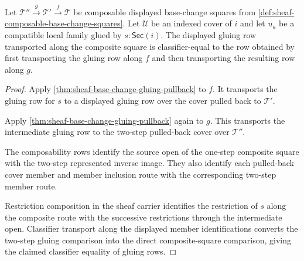 \begin{theorem}
\label{thm:sheaf-base-change-gluing-pullback-composition}
Let $\mathcal{T}''\xrightarrow{g}\mathcal{T}'\xrightarrow{f}\mathcal{T}$ be composable displayed base-change squares from \autoref{def:sheaf-composable-base-change-squares}. Let $\mathcal{U}$ be an indexed cover of $i$ and let $u_a$ be a compatible local family glued by $s:\mathsf{Sec}(i)$. The displayed gluing row transported along the composite square is classifier-equal to the row obtained by first transporting the gluing row along $f$ and then transporting the resulting row along $g$.
\end{theorem}
\begin{proof}
Apply \autoref{thm:sheaf-base-change-gluing-pullback} to $f$. It transports the gluing row for $s$ to a displayed gluing row over the cover pulled back to $\mathcal{T}'$.

Apply \autoref{thm:sheaf-base-change-gluing-pullback} again to $g$. This transports the intermediate gluing row to the two-step pulled-back cover over $\mathcal{T}''$.

The composability rows identify the source open of the one-step composite square with the two-step represented inverse image. They also identify each pulled-back cover member and member inclusion route with the corresponding two-step member route.

Restriction composition in the sheaf carrier identifies the restriction of $s$ along the composite route with the successive restrictions through the intermediate open. Classifier transport along the displayed member identifications converts the two-step gluing comparison into the direct composite-square comparison, giving the claimed classifier equality of gluing rows.
\end{proof}

